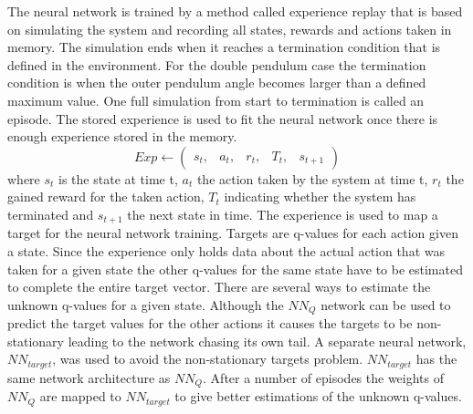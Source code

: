 \documentclass{LTHtwocol} %
\begin{document}
The neural network is trained by a method called experience replay that is based on simulating the system and recording all states, rewards and actions taken in memory.
The simulation ends when it reaches a termination condition that is defined in the environment.
For the double pendulum case the termination condition is when the outer pendulum angle becomes larger than a defined maximum value.
One full simulation from start to termination is called an episode.
The stored experience is used to fit the neural network once there is enough experience stored in the memory.
\begin{equation}
	Exp \leftarrow \begin{pmatrix}s_t, & a_t, & r_t, & T_t, & s_{t+1}	\end{pmatrix}
\end{equation}
where $s_t$ is the state at time t, $a_t$ the action taken by the system at time t, $r_t$ the gained reward for the taken action, $T_t$ indicating whether the system has terminated and $s_{t+1}$ the next state in time.
The experience is used to map a target for the neural network training.
Targets are q-values for each action given a state.
Since the experience only holds data about the actual action that was taken for a given state the other q-values for the same state have to be estimated to complete the entire target vector.
There are several ways to estimate the unknown q-values for a given state.
Although the $NN_Q$ network can be used to predict the target values for the other actions it causes the targets to be non-stationary leading to the network chasing its own tail.
A separate neural network, $NN_{target}$, was used to avoid the non-stationary targets problem.
$NN_{target}$ has the same network architecture as $NN_Q$.
After a number of episodes the weights of $NN_Q$ are mapped to $NN_{target}$ to give better estimations of the unknown q-values.
\end{document}
